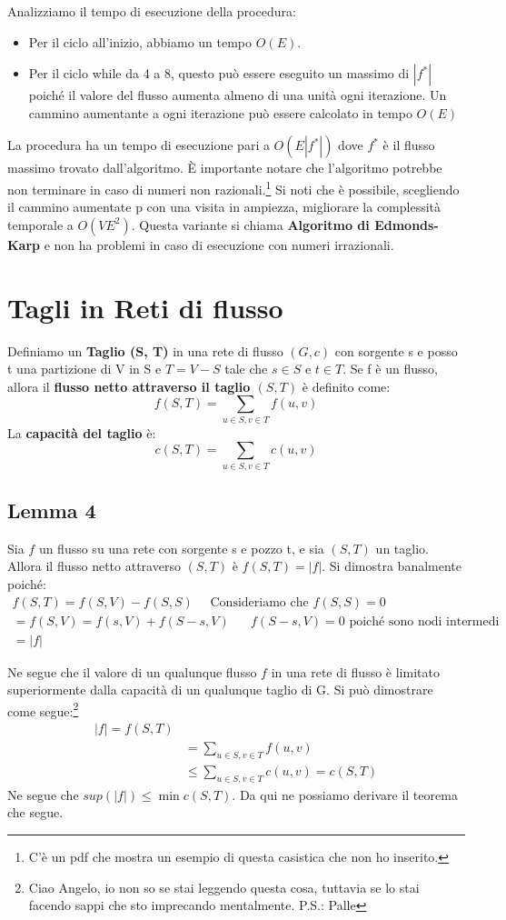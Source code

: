 Analizziamo il tempo di esecuzione della procedura:
\begin{itemize}
    \item Per il ciclo all'inizio, abbiamo un tempo $O(E)$.
    \item Per il ciclo while da 4 a 8, questo può essere eseguito un massimo di $|f^*|$ poiché il valore del flusso aumenta almeno di una unità ogni iterazione. Un cammino aumentante a ogni iterazione può essere calcolato in tempo $O(E)$
\end{itemize}
La procedura ha un tempo di esecuzione pari a $O(E|f^*|)$ dove $f^*$ è il flusso massimo trovato dall'algoritmo. È importante notare che l'algoritmo potrebbe non terminare in caso di numeri non razionali.\footnote{C'è un pdf che mostra un esempio di questa casistica che non ho inserito.} Si noti che è possibile, scegliendo il cammino aumentate p con una visita in ampiezza, migliorare la complessità temporale a $O(VE^2)$. Questa variante si chiama \textbf{Algoritmo di Edmonds-Karp} e non ha problemi in caso di esecuzione con numeri irrazionali. 
\section{Tagli in Reti di flusso}
Definiamo un \textbf{Taglio (S, T)} in una rete di flusso $(G,c)$ con sorgente s e posso t una partizione di V in S e $T = V-S$ tale che $s \in S$ e $t \in T$. 
Se f è un flusso, allora il \textbf{flusso netto attraverso il taglio $(S,T)$} è definito come:
\[f(S,T) = \sum_{u \in S, v \in T}f(u, v)\]
La \textbf{capacità del taglio} è:
\[c(S,T) = \sum_{u \in S, v \in T}c(u, v)\]
\subsection*{Lemma 4}
Sia $f$ un flusso su una rete con sorgente s e pozzo t, e sia $(S,T)$ un taglio. Allora il flusso netto attraverso $(S,T)$ è $f(S,T)= |f|$. 
Si dimostra banalmente poiché:
\begin{align*}
    f(S,T) = f(S,V) - f(S,S) \quad \text{ Consideriamo che $f(S,S) = 0$}\\
    = f(S,V) = f(s,V)+f(S-s,V) \quad \text{ $f(S-s,V) = 0$ poiché sono nodi intermedi}\\
    =|f|
\end{align*}

Ne segue che il valore di un qualunque flusso $f$ in una rete di flusso è limitato superiormente dalla capacità di un qualunque taglio di G. Si può dimostrare come segue:\footnote{Ciao Angelo, io non so se stai leggendo questa cosa, tuttavia se lo stai facendo sappi che sto imprecando mentalmente. P.S.: Palle}
\begin{align*}
    |f| = f(S,T)\\
    & = \sum_{u \in S, v \in T} f(u,v) \\
    &\leq \sum_{u \in S, v \in T} c(u,v) = c(S, T)
\end{align*}
Ne segue che $sup (|f|) \leq \min c(S, T)$. Da qui ne possiamo derivare il teorema che segue.
